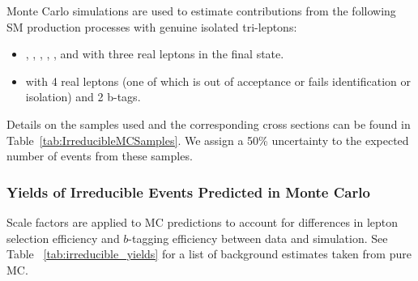         
Monte Carlo simulations are used to estimate contributions from the following SM production processes with genuine isolated tri-leptons:

\begin{itemize}
\item \WZZ, \ttWW, \ttW, \tbZ, \ttG, and \ttH with three real leptons in the final state.
\item \ZZZ with 4 real leptons (one of which is out of acceptance or fails identification or isolation) and 2 b-tags.
\end{itemize}




Details on the samples used and the corresponding cross sections can be found in Table~\ref{tab:IrreducibleMCSamples}.  
We assign a 50\% uncertainty to the expected number of events from these samples.\\
		
		\subsubsection{Yields of Irreducible Events Predicted in Monte Carlo}
		
Scale factors are applied to MC predictions to account for differences in lepton selection efficiency and $b$-tagging efficiency between data and simulation. See Table ~\ref{tab:irreducible_yields} for a list of background estimates taken from pure MC.\\



